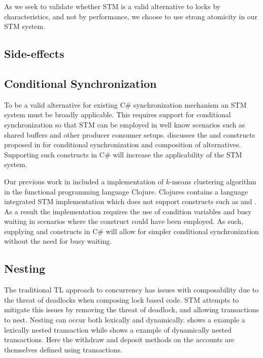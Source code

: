 As we seek to validate whether \ac{STM} is a valid alternative to locks by characteristics, and not by performance, we choose to use strong atomicity in our \ac{STM} system.

\subsection{Side-effects}
% 
 
\subsection{Conditional Synchronization}
To be a valid alternative for existing C\# synchronization mechanism an \ac{STM} system must be broadly applicable. This requires support for conditional synchronization so that \ac{STM} can be employed in well know scenarios such as shared buffers and other producer consumer setups\cite[p. 128]{tanenbaum2008modern}.  discusses the  and  constructs proposed in \cite{harris2005composable} for conditional synchronization and composition of alternatives. Supporting such constructs in C\# will increase the applicability of the \ac{STM} system.

Our previous work in \cite{dpt907e14trending} included a implementation of $k$-means clustering algorithm\cite[p. 451]{dataminingconceptsandtechniques} in the functional programming language Clojure. Clojures contains a language integrated \ac{STM} implementation which does not support constructs such as  and . As a result the implementation requires the use of condition variables and busy waiting in scenarios where the  construct could have been employed\cite{duffy2010stmnet}.  As such, supplying  and  constructs in C\# will allow for simpler conditional synchronization without the need for busy waiting.
\subsection{Nesting}
The traditional \ac{TL} approach to concurrency has issues with composability due to the threat of deadlocks\cite[p. 58]{sutter2005software} when composing lock based code. \ac{STM} attempts to mitigate this issues by removing the threat of deadlock, and allowing transactions to nest. Nesting can occur both lexically and dynamically\cite[p. 1]{kumar2011hparstm}\cite[p. 42]{harris2010transactional}\cite[p. 2081]{herlihy2011tm}.  shows a example a lexically nested transaction while  shows a example of dynamically nested transactions. Here the withdraw and deposit methods on the accounts are themselves defined using transactions.


